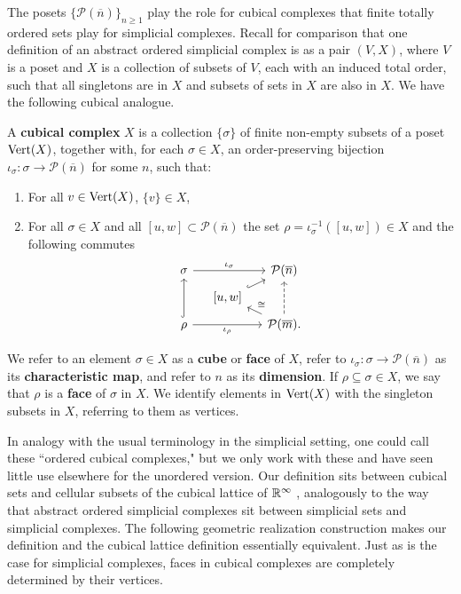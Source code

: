 The posets $\{\mathcal P(\overline n)\}_{n \geq 1}$ play the role for cubical complexes that finite totally ordered sets play for simplicial complexes.
Recall for comparison that one definition of an abstract ordered simplicial complex is as a pair $(V, X)$, where $V$ is a poset and $X$ is a collection of subsets of $V$, each with an induced total order, such that all singletons are in $X$ and subsets of sets in $X$ are also in $X$.
We have the following cubical analogue.

\begin{definition}\label{D:cubical}
	A \textbf{cubical complex} $X$ is a collection $\{ \sigma \}$ of finite non-empty subsets of a poset
	${\rm Vert}(X)$, together with, for each $\sigma \in X$, an order-preserving bijection $\iota_\sigma \colon \sigma \to \mathcal P(\overline n)$ for some $n$, such that:
	\begin{enumerate}
		\item For all $v \in {\rm Vert}(X)$, $\{v\} \in X$,
		\item For all $\sigma \in X$ and all $[u,w] \subset \mathcal P(\overline n)$ the set $\rho = \iota_\sigma^{-1}([u,w]) \in X$ and the following commutes
		\begin{equation*}
		\begin{tikzcd} [row sep = tiny, column sep = small]
		\sigma \arrow[rr, "\iota_\sigma"] && \mathcal P(\overline n) \\
		& [-5pt] {[}u,w{]} \arrow[ur, hook] & \\
		\rho \arrow[uu, hook] \arrow[rr, "\iota_\rho"'] && \mathcal P(\overline m). \arrow[ul, "\cong"'] \arrow[uu, dashed]
		\end{tikzcd}
		\end{equation*}
	\end{enumerate}
	We refer to an element $\sigma \in X$ as a \textbf{cube} or \textbf{face} of $X$, refer to $\iota_\sigma \colon \sigma \to \mathcal P(\overline{n})$ as its \textbf{characteristic map},
	and refer to $n$ as its \textbf{dimension}. If $\rho \subseteq \sigma \in X$, we say that $\rho$ is a \textbf{face} of $\sigma$ in $X$.
	We identify elements in ${\rm Vert}(X)$ with the singleton subsets in $X$, referring to them as vertices.
\end{definition}

In analogy with the usual terminology in the simplicial setting, one could call these ``ordered cubical complexes," but we only work with these and have seen little use elsewhere for the unordered version.
Our definition sits between cubical sets \cite{jardine2002cubical} and cellular subsets of the cubical lattice of $\mathbb{R}^\infty$ \cite{kaczynski2006computational}, analogously to the way that abstract ordered simplicial complexes sit between simplicial sets and simplicial complexes.
The following geometric realization construction makes our definition and the cubical lattice definition essentially equivalent. Just as is the case for simplicial complexes, faces in cubical complexes are completely determined by their vertices.

